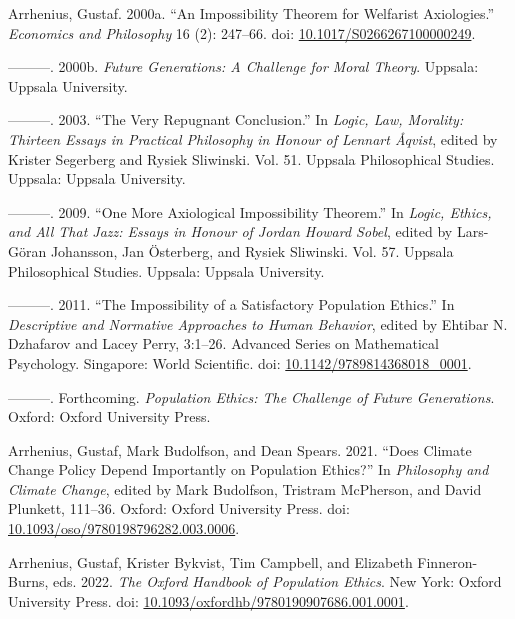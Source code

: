 \documentclass[
  11pt,
  letterpaper,
  DIV=11,
  numbers=noendperiod,
  twoside]{scrartcl}
\newlength{\cslhangindent}
\newenvironment{CSLReferences}[2] %
 {\begin{list}{}{%
  \setlength{\itemindent}{0pt}
  \setlength{\leftmargin}{0pt}
  \setlength{\parsep}{0pt}
  \ifodd #1
   \setlength{\leftmargin}{\cslhangindent}
   \setlength{\itemindent}{-1\cslhangindent}
  \fi
  \setlength{\itemsep}{#2\baselineskip}}}
 {\end{list}}
\begin{document}
\protect{}\label{refs}
\begin{CSLReferences}{1}{0}
Arrhenius, Gustaf. 2000a. {``An Impossibility Theorem for Welfarist
Axiologies.''} \emph{Economics and Philosophy} 16 (2): 247--66. doi:
\href{https://doi.org/10.1017/S0266267100000249}{10.1017/S0266267100000249}.

---------. 2000b. \emph{Future Generations: A Challenge for Moral
Theory}. Uppsala: Uppsala University.

---------. 2003. {``The Very Repugnant Conclusion.''} In \emph{Logic,
Law, Morality: Thirteen Essays in Practical Philosophy in Honour of
Lennart {Å}qvist}, edited by Krister Segerberg and Rysiek Sliwinski.
Vol. 51. Uppsala Philosophical Studies. Uppsala: Uppsala University.

---------. 2009. {``One More Axiological Impossibility Theorem.''} In
\emph{Logic, Ethics, and All That Jazz: Essays in Honour of Jordan
Howard Sobel}, edited by Lars-Göran Johansson, Jan Österberg, and Rysiek
Sliwinski. Vol. 57. Uppsala Philosophical Studies. Uppsala: Uppsala
University.

---------. 2011. {``The Impossibility of a Satisfactory Population
Ethics.''} In \emph{Descriptive and Normative Approaches to Human
Behavior}, edited by Ehtibar N. Dzhafarov and Lacey Perry, 3:1--26.
Advanced Series on Mathematical Psychology. Singapore: World Scientific.
doi:
\href{https://doi.org/10.1142/9789814368018_0001}{10.1142/9789814368018\_0001}.

---------. Forthcoming. \emph{Population Ethics: The Challenge of Future
Generations}. Oxford: Oxford University Press.

Arrhenius, Gustaf, Mark Budolfson, and Dean Spears. 2021. {``Does
Climate Change Policy Depend Importantly on Population Ethics?''} In
\emph{Philosophy and Climate Change}, edited by Mark Budolfson, Tristram
McPherson, and David Plunkett, 111--36. Oxford: Oxford University Press.
doi:
\href{https://doi.org/10.1093/oso/9780198796282.003.0006}{10.1093/oso/9780198796282.003.0006}.

Arrhenius, Gustaf, Krister Bykvist, Tim Campbell, and Elizabeth
Finneron-Burns, eds. 2022. \emph{The Oxford Handbook of Population
Ethics}. New York: Oxford University Press. doi:
\href{https://doi.org/10.1093/oxfordhb/9780190907686.001.0001}{10.1093/oxfordhb/9780190907686.001.0001}.


\end{CSLReferences}
\end{document}
